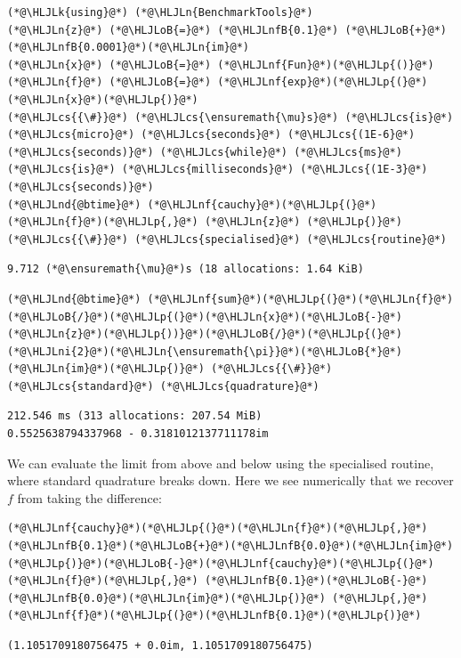 \documentclass[12pt,a4paper]{article}
\newcommand{\HLJLk}[1]{\textcolor[RGB]{148,91,176}{\textbf{#1}}}
\newcommand{\HLJLn}[1]{#1}
\newcommand{\HLJLnd}[1]{\textcolor[RGB]{214,102,97}{#1}}
\newcommand{\HLJLnf}[1]{\textcolor[RGB]{66,102,213}{#1}}
\newcommand{\HLJLnfB}[1]{\textcolor[RGB]{59,151,46}{#1}}
\newcommand{\HLJLni}[1]{\textcolor[RGB]{59,151,46}{#1}}
\newcommand{\HLJLoB}[1]{\textcolor[RGB]{102,102,102}{\textbf{#1}}}
\newcommand{\HLJLp}[1]{#1}
\newcommand{\HLJLcs}[1]{\textcolor[RGB]{153,153,119}{\textit{#1}}}
\begin{document}
\begin{lstlisting}
(*@\HLJLk{using}@*) (*@\HLJLn{BenchmarkTools}@*)
(*@\HLJLn{z}@*) (*@\HLJLoB{=}@*) (*@\HLJLnfB{0.1}@*) (*@\HLJLoB{+}@*)(*@\HLJLnfB{0.0001}@*)(*@\HLJLn{im}@*)
(*@\HLJLn{x}@*) (*@\HLJLoB{=}@*) (*@\HLJLnf{Fun}@*)(*@\HLJLp{()}@*)
(*@\HLJLn{f}@*) (*@\HLJLoB{=}@*) (*@\HLJLnf{exp}@*)(*@\HLJLp{(}@*)(*@\HLJLn{x}@*)(*@\HLJLp{)}@*)
(*@\HLJLcs{{\#}}@*) (*@\HLJLcs{\ensuremath{\mu}s}@*) (*@\HLJLcs{is}@*) (*@\HLJLcs{micro}@*) (*@\HLJLcs{seconds}@*) (*@\HLJLcs{(1E-6}@*) (*@\HLJLcs{seconds)}@*) (*@\HLJLcs{while}@*) (*@\HLJLcs{ms}@*) (*@\HLJLcs{is}@*) (*@\HLJLcs{milliseconds}@*) (*@\HLJLcs{(1E-3}@*) (*@\HLJLcs{seconds)}@*) 
(*@\HLJLnd{@btime}@*) (*@\HLJLnf{cauchy}@*)(*@\HLJLp{(}@*)(*@\HLJLn{f}@*)(*@\HLJLp{,}@*) (*@\HLJLn{z}@*) (*@\HLJLp{)}@*) (*@\HLJLcs{{\#}}@*) (*@\HLJLcs{specialised}@*) (*@\HLJLcs{routine}@*)
\end{lstlisting}

\begin{lstlisting}
9.712 (*@\ensuremath{\mu}@*)s (18 allocations: 1.64 KiB)
\end{lstlisting}


\begin{lstlisting}
(*@\HLJLnd{@btime}@*) (*@\HLJLnf{sum}@*)(*@\HLJLp{(}@*)(*@\HLJLn{f}@*)(*@\HLJLoB{/}@*)(*@\HLJLp{(}@*)(*@\HLJLn{x}@*)(*@\HLJLoB{-}@*)(*@\HLJLn{z}@*)(*@\HLJLp{))}@*)(*@\HLJLoB{/}@*)(*@\HLJLp{(}@*)(*@\HLJLni{2}@*)(*@\HLJLn{\ensuremath{\pi}}@*)(*@\HLJLoB{*}@*)(*@\HLJLn{im}@*)(*@\HLJLp{)}@*) (*@\HLJLcs{{\#}}@*) (*@\HLJLcs{standard}@*) (*@\HLJLcs{quadrature}@*)
\end{lstlisting}

\begin{lstlisting}
212.546 ms (313 allocations: 207.54 MiB)
0.5525638794337968 - 0.3181012137711178im
\end{lstlisting}


We can evaluate the limit from above and below using the specialised routine,  where standard quadrature breaks down. Here we see numerically that we recover $f$ from taking the difference:


\begin{lstlisting}
(*@\HLJLnf{cauchy}@*)(*@\HLJLp{(}@*)(*@\HLJLn{f}@*)(*@\HLJLp{,}@*) (*@\HLJLnfB{0.1}@*)(*@\HLJLoB{+}@*)(*@\HLJLnfB{0.0}@*)(*@\HLJLn{im}@*)(*@\HLJLp{)}@*)(*@\HLJLoB{-}@*)(*@\HLJLnf{cauchy}@*)(*@\HLJLp{(}@*)(*@\HLJLn{f}@*)(*@\HLJLp{,}@*) (*@\HLJLnfB{0.1}@*)(*@\HLJLoB{-}@*)(*@\HLJLnfB{0.0}@*)(*@\HLJLn{im}@*)(*@\HLJLp{)}@*) (*@\HLJLp{,}@*) (*@\HLJLnf{f}@*)(*@\HLJLp{(}@*)(*@\HLJLnfB{0.1}@*)(*@\HLJLp{)}@*)
\end{lstlisting}

\begin{lstlisting}
(1.1051709180756475 + 0.0im, 1.1051709180756475)
\end{lstlisting}
\end{document}
